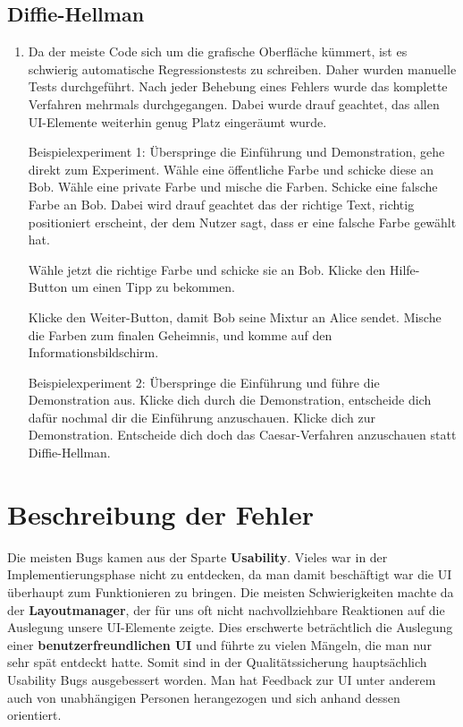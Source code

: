 \documentclass{article}
\begin{document}
  \subsection{Diffie-Hellman}

	  \begin{enumerate}
	      \item Da der meiste Code sich um die grafische Oberfläche kümmert, ist es schwierig
	          automatische Regressionstests zu schreiben. Daher wurden manuelle Tests durchgeführt.
	          Nach jeder Behebung eines Fehlers wurde das komplette Verfahren mehrmals durchgegangen.
	          Dabei wurde drauf geachtet, das allen UI-Elemente weiterhin genug Platz eingeräumt wurde.
	
	          Beispielexperiment 1:
	          Überspringe die Einführung und Demonstration, gehe direkt zum Experiment.
	          Wähle eine öffentliche Farbe und schicke diese an Bob.
	          Wähle eine private Farbe und mische die Farben. Schicke eine falsche
	          Farbe an Bob. Dabei wird drauf geachtet das der richtige Text, richtig positioniert
	          erscheint, der dem Nutzer sagt, dass er eine falsche Farbe gewählt hat.
	
	          Wähle jetzt die richtige Farbe und schicke sie an Bob.
	          Klicke den Hilfe-Button um einen Tipp zu bekommen.
	          
	          Klicke den Weiter-Button, damit Bob seine Mixtur an Alice sendet.
	          Mische die Farben zum finalen Geheimnis, und komme auf den Informationsbildschirm.
	
	          Beispielexperiment 2:
	          Überspringe die Einführung und führe die Demonstration aus.
	          Klicke dich durch die Demonstration, entscheide dich dafür
	          nochmal dir die Einführung anzuschauen. Klicke dich zur Demonstration.
	          Entscheide dich doch das Caesar-Verfahren anzuschauen statt Diffie-Hellman.
	      \end{enumerate}
\clearpage		

\section{Beschreibung der Fehler}
  Die meisten Bugs kamen aus der Sparte \textbf{Usability}. Vieles war in der Implementierungsphase nicht zu entdecken, da man damit beschäftigt
  war die UI überhaupt zum Funktionieren zu bringen. Die meisten Schwierigkeiten machte da der \textbf{Layoutmanager}, der für uns oft nicht
  nachvollziehbare Reaktionen auf die Auslegung unsere UI-Elemente zeigte.\newline 
  Dies erschwerte beträchtlich die Auslegung einer \textbf{benutzerfreundlichen UI} und führte zu vielen Mängeln, die man
  nur sehr spät entdeckt hatte. Somit sind in der Qualitätssicherung hauptsächlich Usability Bugs ausgebessert worden. 
  Man hat Feedback zur UI unter anderem auch von unabhängigen Personen herangezogen und sich anhand dessen orientiert. 
  
\end{document}
